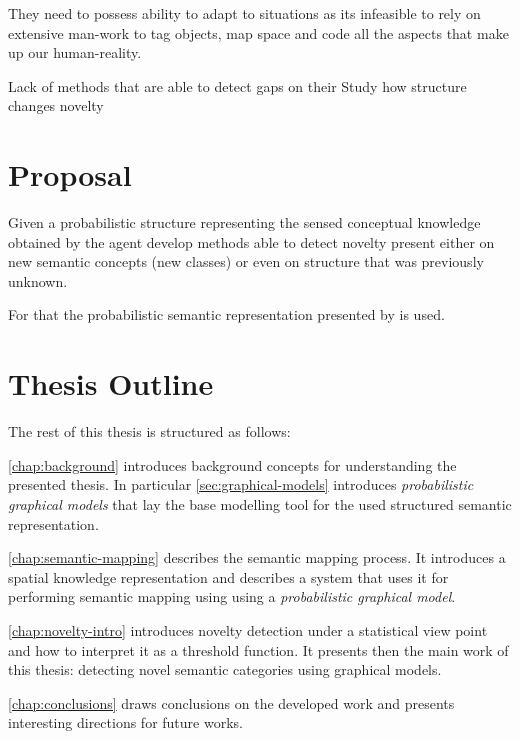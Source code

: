 They need to possess ability to adapt to situations as its infeasible to rely
on extensive man-work to tag objects, map space and code all the aspects that
make up our human-reality.


Lack of methods that are able to detect gaps on their
Study how structure changes novelty

\section{Proposal}

%
Given a probabilistic structure representing the sensed conceptual knowledge
obtained by the agent develop methods able to detect novelty present
either on new semantic concepts (new classes) or even on structure that was
previously unknown.


For that the probabilistic semantic representation presented by
\cite{pronobis2011phd} is used.

%



\section{Thesis Outline}
The rest of this thesis is structured as follows:

\autoref{chap:background} introduces background concepts for understanding the
presented thesis. In particular \autoref{sec:graphical-models} introduces
\emph{probabilistic graphical models} that lay the base modelling tool for
the used structured semantic representation.

\autoref{chap:semantic-mapping} describes the semantic mapping process.
It introduces a spatial knowledge representation and describes a system
that uses it for performing semantic mapping using using a \emph{probabilistic graphical model}.

\autoref{chap:novelty-intro} introduces novelty detection under a
statistical view point and how to interpret it as a threshold function.
It presents then the main work of this thesis: detecting novel semantic
categories using graphical models.

\autoref{chap:conclusions} draws conclusions on the developed work and presents
interesting directions for future works.



